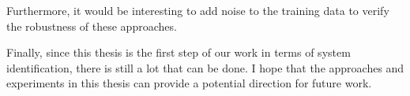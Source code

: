 \documentclass[
	parskip, 			   %
	twoside, 			   %
	DIV=14, 			   %
	BCOR=15.0mm, 		   %
	headsepline, 		   %
	open=right, 		   %
	captions=tableheading, %
	bibliography=totoc,    %
	numbers=noenddot       %
]{scrreprt}
\begin{document}
Furthermore, it would be interesting to add noise to the training data to verify the robustness of these approaches.

Finally, since this thesis is the first step of our work in terms of system identification, there is still a lot that can be done. I hope that the approaches and experiments in this thesis can provide a potential direction for future work.


\renewcommand{\bibname}{References} %



\appendix
\end{document}
